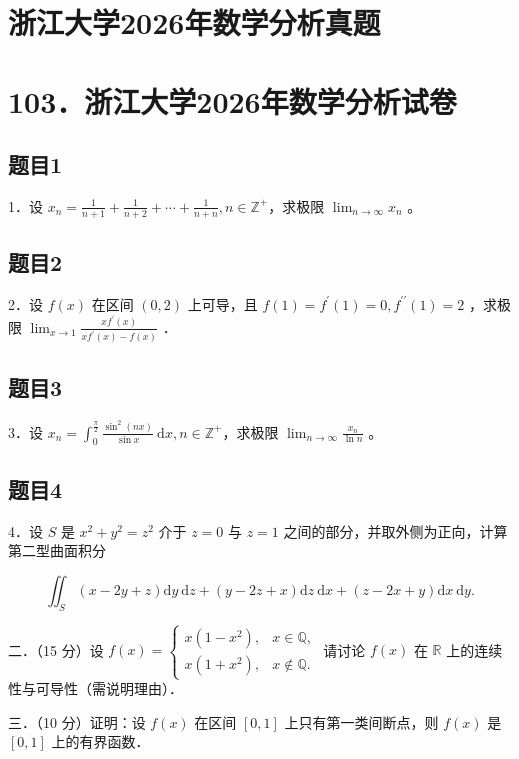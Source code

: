 \documentclass{article}
\begin{document}
\section*{浙江大学2026年数学分析真题}
\section*{103．浙江大学2026年数学分析试卷}

\subsection{题目1}
1．设 \(x_{n}=\frac{1}{n+1}+\frac{1}{n+2}+\cdots+\frac{1}{n+n}, n \in \mathbb{Z}^{+}\)，求极限 \(\lim _{n \rightarrow \infty} x_{n}\) 。

\subsection{题目2}
2．设 \(f(x)\) 在区间 \((0,2)\) 上可导，且 \(f(1)=f^{\prime}(1)=0, f^{\prime \prime}(1)=2\) ，求极限 \(\lim _{x \rightarrow 1} \frac{x f^{\prime}(x)}{x f^{\prime}(x)-f(x)}\) ．

\subsection{题目3}
3．设 \(x_{n}=\int_{0}^{\frac{\pi}{2}} \frac{\sin ^{2}(n x)}{\sin x} \mathrm{~d} x, n \in \mathbb{Z}^{+}\)，求极限 \(\lim _{n \rightarrow \infty} \frac{x_{n}}{\ln n}\) 。

\subsection{题目4}
4．设 \(S\) 是 \(x^{2}+y^{2}=z^{2}\) 介于 \(z=0\) 与 \(z=1\) 之间的部分，并取外侧为正向，计算第二型曲面积分

\[
\iint_{S}(x-2 y+z) \mathrm{d} y \mathrm{~d} z+(y-2 z+x) \mathrm{d} z \mathrm{~d} x+(z-2 x+y) \mathrm{d} x \mathrm{~d} y .
\]

二．（15 分）设 \(f(x)=\left\{\begin{array}{ll}x\left(1-x^{2}\right), & x \in \mathbb{Q}, \\ x\left(1+x^{2}\right), & x \notin \mathbb{Q} .\end{array}\right.\) 请讨论 \(f(x)\) 在 \(\mathbb{R}\) 上的连续性与可导性（需说明理由）．

三．（10 分）证明：设 \(f(x)\) 在区间 \([0,1]\) 上只有第一类间断点，则 \(f(x)\) 是 \([0,1]\) 上的有界函数．
\end{document}
